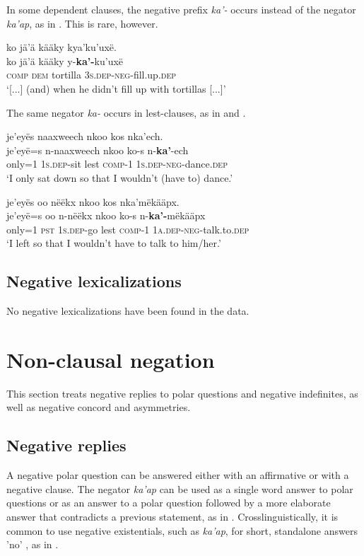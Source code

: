 \documentclass[output=paper,colorlinks,citecolor=brown,draft]{langscibook}
\begin{document}
In some dependent clauses, the negative prefix \textit{ka’-} occurs instead of the negator \textit{ka’ap}, as in . This is rare, however. 

\ea\label{ex:mix:98}
    \glll ko jä’ä kääky kya’ku’uxë.\\
          ko jä’ä kääky y-\textbf{ka’-}ku’uxë\\
          \textsc{comp} \textsc{dem} tortilla 3\textsc{s.dep-neg}{}-fill.up.\textsc{dep}\\
    \glt ‘[...] (and) when he didn’t fill up with tortillas [...]’
\z

The same negator \textit{ka-} occurs in lest-clauses, as in  and .

\ea\label{ex:mix:99}
    \glll je’eyës naaxweech nkoo kos nka’ech.\\
          je’eyë=s n-naaxweech nkoo ko-s n-\textbf{ka’}{}-ech \\
          only=1 \textsc{1s.dep}-sit lest \textsc{comp}-1 \textsc{1s.dep-neg-}dance.\textsc{dep}\\
    \glt ‘I only sat down so that I wouldn’t (have to) dance.’
\z

\ea\label{ex:mix:100}
    \glll je’eyës oo nëëkx nkoo kos nka’mëkääpx.\\
          je’eyë=s oo n-nëëkx nkoo ko-s n-\textbf{ka’-}mëkääpx\\
          only=1 \textsc{pst} \textsc{1s.dep-}go lest \textsc{comp}-1 \textsc{1a.dep-neg-}talk.to.\textsc{dep}\\
    \glt ‘I left so that I wouldn’t have to talk to him/her.’
\z

\subsection{Negative lexicalizations}
No negative lexicalizations have been found in the data.

 \section{Non-clausal negation}\label{sec:mix:3}

This section treats negative replies to polar questions and negative indefinites, as well as negative concord and asymmetries.

\subsection{Negative replies}\label{sec:mix:3.1}
\largerpage
A negative polar question can be answered either with an affirmative or with a negative clause. The negator \textit{ka’ap} can be used as a single word answer to polar questions or as an answer to a polar question followed by a more elaborate answer that contradicts a previous statement, as in . Crosslinguistically, it is common to use negative existentials, such as \textit{ka’ap}, for short, standalone answers 'no' \citep{Veselinova2013neg.exist}, as in . 
\end{document}
